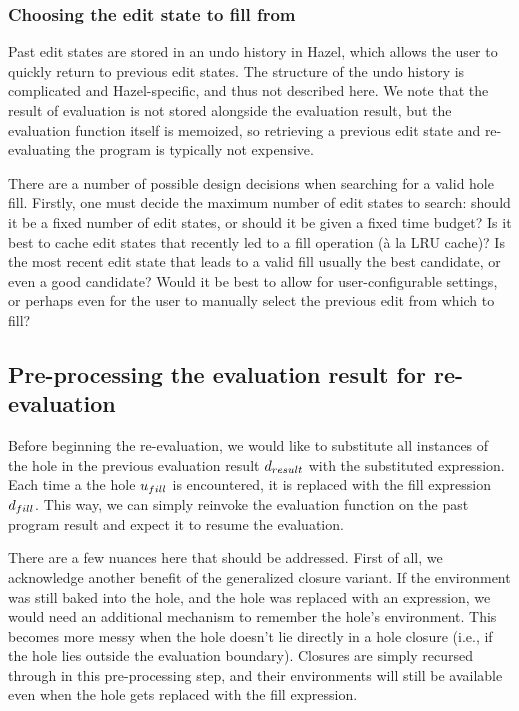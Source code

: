 \subsubsection{Choosing the edit state to fill from}
\label{sec:far-past-edit-states}

Past edit states are stored in an undo history in Hazel, which allows the user to quickly return to previous edit states. The structure of the undo history is complicated and Hazel-specific, and thus not described here. We note that the result of evaluation is not stored alongside the evaluation result, but the evaluation function itself is memoized, so retrieving a previous edit state and re-evaluating the program is typically not expensive.


There are a number of possible design decisions when searching for a valid hole fill. Firstly, one must decide the maximum number of edit states to search: should it be a fixed number of edit states, or should it be given a fixed time budget? Is it best to cache edit states that recently led to a fill operation (\`a la LRU cache)? Is the most recent edit state that leads to a valid fill usually the best candidate, or even a good candidate? Would it be best to allow for user-configurable settings, or perhaps even for the user to manually select the previous edit from which to fill?


\subsection{Pre-processing the evaluation result for re-evaluation}
\label{sec:far-preprocessing}

Before beginning the re-evaluation, we would like to substitute all instances of the hole in the previous evaluation result $d_{result}$ with the substituted expression. Each time a the hole $u_{fill}$ is encountered, it is replaced with the fill expression $d_{fill}$. This way, we can simply reinvoke the evaluation function on the past program result and expect it to resume the evaluation.

There are a few nuances here that should be addressed. First of all, we acknowledge another benefit of the generalized closure variant. If the environment was still baked into the hole, and the hole was replaced with an expression, we would need an additional mechanism to remember the hole's environment. This becomes more messy when the hole doesn't lie directly in a hole closure (i.e., if the hole lies outside the evaluation boundary). Closures are simply recursed through in this pre-processing step, and their environments will still be available even when the hole gets replaced with the fill expression.

